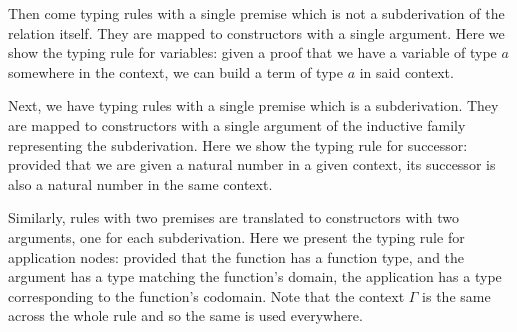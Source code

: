 Then come typing rules with a single premise which is not a subderivation
of the relation itself.
They are mapped to constructors with a single argument.
%
Here we show the typing rule for variables: given a proof that we have a
variable of type $a$ somewhere in the context, we can build a term of type
$a$ in said context.

\begin{centertight}
\begin{minipage}{0.45\textwidth}
\inferenceVar
\end{minipage}\hfill
\begin{minipage}{0.45\textwidth}
\end{minipage}
\end{centertight}

Next, we have typing rules with a single premise which is a subderivation.
They are mapped to constructors with a single argument of the inductive family
representing the subderivation.
%
Here we show the typing rule for successor: provided that we are given
a natural number in a given context, its successor is also a natural
number in the same context.

\begin{centertight}
\begin{minipage}{0.45\textwidth}
\inferenceInc
\end{minipage}\hfill
\begin{minipage}{0.45\textwidth}
\end{minipage}
\end{centertight}

Similarly, rules with two premises are translated to constructors
with two arguments, one for each subderivation.
%
Here we present the typing rule for application nodes: provided that
the function has a function type, and the argument has a type matching
the function's domain, the application has a type corresponding to the
function's codomain.
Note that the context $\Gamma$ is the same across the whole rule and
so the same  is used everywhere.


\begin{centertight}
\begin{minipage}{0.35\textwidth}
\inferenceApp
\end{minipage}\hfill
\begin{minipage}{0.55\textwidth}
\end{minipage}
\end{centertight}

